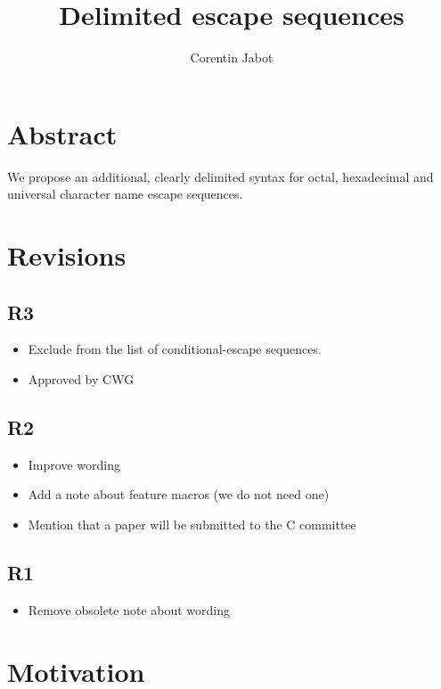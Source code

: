\documentclass{wg21}
\title{Delimited escape sequences}
\author{Corentin Jabot}{corentin.jabot@gmail.com}
\begin{document}
\maketitle

\paperquote{}

\section{Abstract}

We propose an additional, clearly delimited syntax for octal, hexadecimal and universal character name escape sequences.

\section{Revisions}

\subsection{R3}
\begin{itemize}
    \item Exclude  from the list of conditional-escape sequences.
    \item Approved by CWG
\end{itemize}

\subsection{R2}
\begin{itemize}
    \item Improve wording
    \item Add a note about feature macros (we do not need one)
    \item Mention that a paper will be submitted to the C committee
\end{itemize}

\subsection{R1}
\begin{itemize}
\item Remove obsolete note about wording
\end{itemize}

\section{Motivation}
\end{document}
